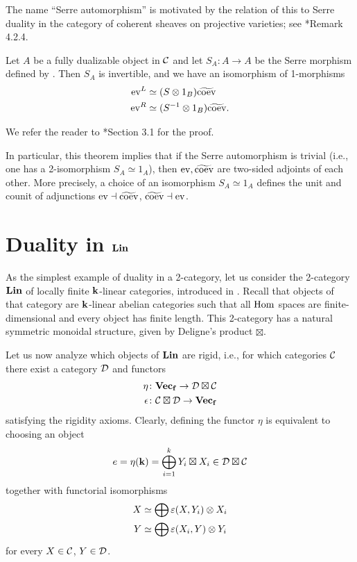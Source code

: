 \begin{remark}
  The name ``Serre automorphism'' is motivated by the relation of this to Serre
  duality in the category of coherent sheaves on projective varieties; see
  *{Remark 4.2.4}.
\end{remark}


\begin{theorem}\label{t:serre}
  Let $A$ be a fully dualizable object in $\mathcal{C}$ and let
  $S_A\colon A\to A$ be the Serre morphism defined by .
   Then $S_A$ is invertible, and we have an isomorphism of 1-morphisms
   \begin{align*}
   \operatorname{ev}^L&\simeq (S\otimes 1_B)  \widetilde {\operatorname{coev}} \\
   \operatorname{ev}^R&\simeq (S^{-1}\otimes 1_B)\widetilde {\operatorname{coev}}.
   \end{align*}
\end{theorem}
We refer the reader to *{Section 3.1} for the proof.

In particular, this theorem implies that if the Serre automorphism is trivial
(i.e., one has a 2-isomorphism $S_A\simeq 1_A$), then $\operatorname{ev}, \widetilde{\operatorname{coev}}$ are
two-sided adjoints of each other. More precisely, a choice of an isomorphism
$S_A\simeq 1_A$ defines the unit and counit of adjunctions $\operatorname{ev}\dashv
\widetilde{\operatorname{coev}}$, $\widetilde{\operatorname{coev}}\dashv\operatorname{ev}$.



\section{Duality in $\mathbf{Lin}$}\label{s:lin-duals}
As the simplest example of duality in a 2-category, let us consider the
2-category $\mathbf{Lin}$ of locally finite $\mathbf{k}$-linear  categories, introduced in
. Recall that objects of that category are $\mathbf{k}$-linear
abelian categories such that all $\operatorname{Hom}$ spaces are finite-dimensional and every
object has finite length. This 2-category has a natural symmetric monoidal
structure, given by Deligne's product $\boxtimes$.

Let us now analyze which objects of $\mathbf{Lin}$ are rigid, i.e., for which
categories $\mathcal{C}$ there exist a category $\mathcal{D}$ and functors
\begin{align*}
  \eta&\colon \mathbf{Vec_f} \to \mathcal{D}\boxtimes \mathcal{C}\\
  \epsilon&\colon \mathcal{C}\boxtimes \mathcal{D}\to \mathbf{Vec_f}
\end{align*}
satisfying the rigidity axioms. Clearly, defining the functor $\eta$ is equivalent
to choosing an object
$$
  e=\eta (\mathbf{k})=\bigoplus_{i=1}^k Y_i\boxtimes X_i\in \mathcal{D}\boxtimes \mathcal{C}
$$
together with functorial isomorphisms
\begin{equation}\label{e:rigidity-lin}
  \begin{aligned}
    X&\simeq \bigoplus \varepsilon(X,Y_i)\otimes X_i\\
    Y&\simeq \bigoplus \varepsilon(X_i,Y)\otimes Y_i
  \end{aligned}
\end{equation}
for every $X\in \mathcal{C}$, $Y\in \mathcal{D}$.

